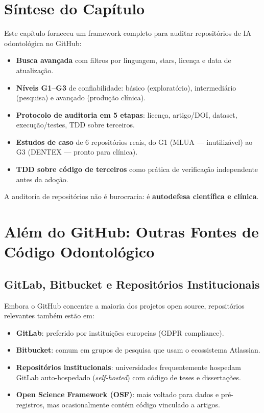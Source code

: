 \section{Síntese do Capítulo}

Este capítulo forneceu um framework completo para auditar repositórios
de IA odontológica no GitHub:

\begin{itemize}
  \item \textbf{Busca avançada} com filtros por linguagem, stars, licença
    e data de atualização.
  \item \textbf{Níveis G1--G3} de confiabilidade: básico (exploratório),
    intermediário (pesquisa) e avançado (produção clínica).
  \item \textbf{Protocolo de auditoria em 5 etapas}: licença, artigo/DOI,
    dataset, execução/testes, TDD sobre terceiros.
  \item \textbf{Estudos de caso} de 6 repositórios reais, do G1 (MLUA —
    inutilizável) ao G3 (DENTEX — pronto para clínica).
  \item \textbf{TDD sobre código de terceiros} como prática de verificação
    independente antes da adoção.
\end{itemize}

A auditoria de repositórios não é burocracia: é \textbf{autodefesa
científica e clínica}.

\section{Além do GitHub: Outras Fontes de Código Odontológico}

\subsection{GitLab, Bitbucket e Repositórios Institucionais}

Embora o GitHub concentre a maioria dos projetos open source, repositórios
relevantes também estão em:

\begin{itemize}
  \item \textbf{GitLab}: preferido por instituições europeias (GDPR compliance).
  \item \textbf{Bitbucket}: comum em grupos de pesquisa que usam o ecossistema Atlassian.
  \item \textbf{Repositórios institucionais}: universidades frequentemente hospedam
    GitLab auto-hospedado (\textit{self-hosted}) com código de teses e dissertações.
  \item \textbf{Open Science Framework (OSF)}: mais voltado para dados e pré-registros,
    mas ocasionalmente contém código vinculado a artigos.
\end{itemize}

